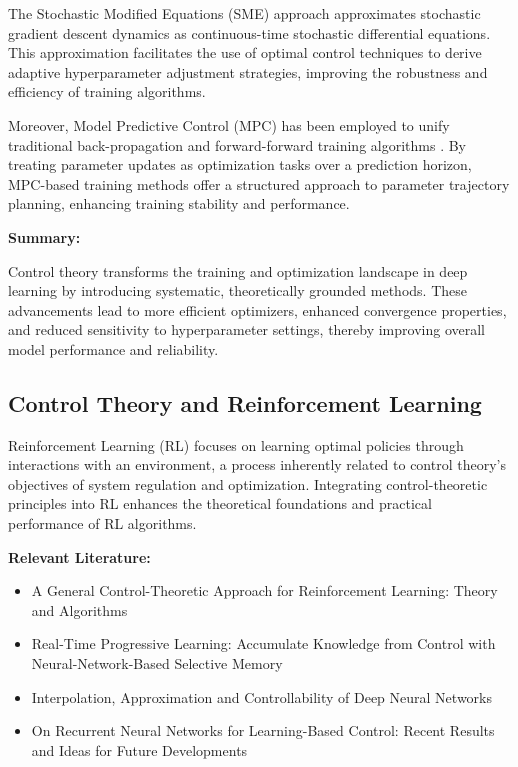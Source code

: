 \documentclass{article}
\theoremstyle{plain}
\theoremstyle{definition}
\theoremstyle{remark}
\begin{document}
The Stochastic Modified Equations (SME) approach \cite{liStochasticModifiedEquations2017} approximates stochastic gradient descent dynamics as continuous-time stochastic differential equations. This approximation facilitates the use of optimal control techniques to derive adaptive hyperparameter adjustment strategies, improving the robustness and efficiency of training algorithms.

Moreover, Model Predictive Control (MPC) has been employed to unify traditional back-propagation and forward-forward training algorithms \cite{renUnifyingBackpropagationForwardforward2024}. By treating parameter updates as optimization tasks over a prediction horizon, MPC-based training methods offer a structured approach to parameter trajectory planning, enhancing training stability and performance.

\textbf{Summary:}

Control theory transforms the training and optimization landscape in deep learning by introducing systematic, theoretically grounded methods. These advancements lead to more efficient optimizers, enhanced convergence properties, and reduced sensitivity to hyperparameter settings, thereby improving overall model performance and reliability.

\subsection{Control Theory and Reinforcement Learning}

Reinforcement Learning (RL) focuses on learning optimal policies through interactions with an environment, a process inherently related to control theory's objectives of system regulation and optimization. Integrating control-theoretic principles into RL enhances the theoretical foundations and practical performance of RL algorithms.

\textbf{Relevant Literature:}
\begin{itemize}
    \item A General Control-Theoretic Approach for Reinforcement Learning: Theory and Algorithms
    \item Real-Time Progressive Learning: Accumulate Knowledge from Control with Neural-Network-Based Selective Memory
    \item Interpolation, Approximation and Controllability of Deep Neural Networks
    \item On Recurrent Neural Networks for Learning-Based Control: Recent Results and Ideas for Future Developments
\end{itemize}
\end{document}
